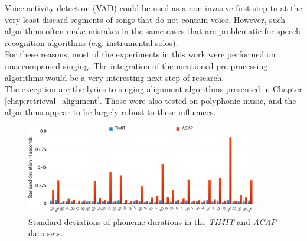 \begin{description}
 Voice activity detection (VAD) could be used as a non-invasive first step to at the very least discard segments of songs that do not contain voice. However, such algorithms often make mistakes in the same cases that are problematic for speech recognition algorithms (e.g. instrumental solos)\cite{schlueter2016_ismir}.\\
 For these reasons, most of the experiments in this work were performed on unaccompanied singing. The integration of the mentioned pre-processing algorithms would be a very interesting next step of research.\\
 The exception are the lyrics-to-singing alignment algorithms presented in Chapter \ref{chap:retrieval_alignment}. Those were also tested on polyphonic music, and the algorithms appear to be largely robust to these influences.
 \end{description}

\begin{figure}
	\begin{center}
		\includegraphics[width=0.9\textwidth]{images/phoneme_stats.png}
		\caption{Standard deviations of phoneme durations in the \textit{TIMIT} and \textit{ACAP} data sets.}
		\label{fig:phoneme_stats}
	\end{center}
\end{figure}


